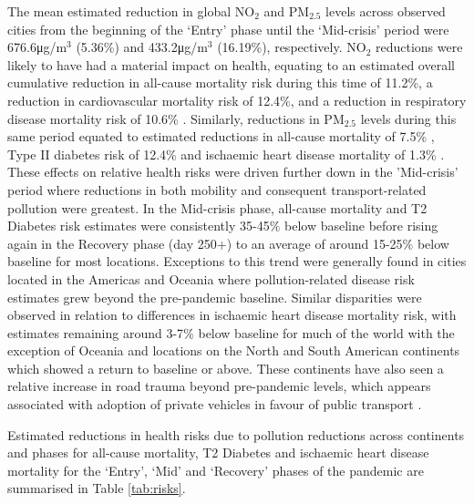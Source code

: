 \documentclass[preprint,10pt]{elsarticle} %
\begin{document}
The mean estimated reduction in global NO$_{2}$ and PM$_{2.5}$ levels across observed cities from the beginning of the `Entry' phase until the `Mid-crisis' period were 676.6\si{\micro\gram}/m$^{3}$ (5.36\%) and 433.2\si{\micro\gram}/m$^{3}$ (16.19\%), respectively. NO$_{2}$ reductions were likely to have had a material impact on health, equating to an estimated overall cumulative reduction in all-cause mortality risk during this time of 11.2\%, a reduction in cardiovascular mortality risk of 12.4\%, and a reduction in respiratory disease mortality risk of 10.6\% \cite{Huang19Pollution}. Similarly, reductions in PM$_{2.5}$ levels during this same period equated to estimated reductions in all-cause mortality of 7.5\% \cite{Yu2020PM2.5}, Type II diabetes risk of 12.4\% and ischaemic heart disease mortality of 1.3\% \cite{Xie257}. These effects on relative health risks were driven further down in the 'Mid-crisis' period where reductions in both mobility and consequent transport-related pollution were greatest. In the Mid-crisis phase, all-cause mortality and T2 Diabetes risk estimates were consistently 35-45$\%$ below baseline before rising again in the Recovery phase (day 250+) to an average of around 15-25$\%$ below baseline for most locations. Exceptions to this trend were generally found in cities located in the Americas and Oceania where pollution-related disease risk estimates grew beyond the pre-pandemic baseline. Similar disparities were observed in relation to differences in ischaemic heart disease mortality risk, with estimates remaining around 3-7$\%$ below baseline for much of the world with the exception of Oceania and locations on the North and South American continents which showed a return to baseline or above. These continents have also seen a relative increase in road trauma beyond pre-pandemic levels, which appears associated with adoption of private vehicles in favour of public transport \cite{ITFRS, saladie2023back, DAS20211}. 


Estimated reductions in health risks due to pollution reductions across continents and phases for all-cause mortality, T2 Diabetes and ischaemic heart disease mortality for the `Entry', `Mid' and `Recovery' phases of the pandemic are summarised in Table \ref{tab:risks}. 
\end{document}
